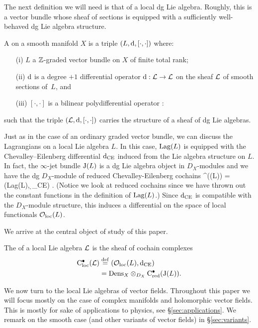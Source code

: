 \documentclass[11pt]{amsart}
\begin{document}
The next definition we will need is that of a local dg Lie algebra. 
Roughly, this is a vector bundle whose sheaf of sections is equipped with a sufficiently well-behaved dg Lie algebra structure.

\begin{dfn} 
A  on a smooth manifold $X$ is a triple $(L, {\rm d}, [\cdot , \cdot])$ where:
\begin{itemize}
\item[(i)] $L$ a $\mathbb Z$-graded vector bundle on $X$ of finite total rank;
\item[(ii)] ${\rm d}$ is a degree $+1$ differential operator ${\rm d} : \mathcal L \to \mathcal L$ on the sheaf $\mathcal L$ of smooth sections of~$L$, and
\item[(iii)] $[\cdot, \cdot]$ is a bilinear polydifferential operator
\beqn
[\cdot , \cdot] : \cL \times \cL \to \cL
\eeqn
\end{itemize}
such that the triple $(\mathcal L, {\rm d}, [\cdot,\cdot])$ carries the structure of a sheaf of dg Lie algebras. 
\end{dfn}

Just as in the case of an ordinary graded vector bundle, we can discuss the Lagrangians on a local Lie algebra $L$. 
In this case, ${\rm Lag}(L)$ is equipped with the Chevalley--Eilenberg differential ${\rm d}_{\rm CE}$ induced from the Lie algebra structure on $L$. 
In fact, the $\infty$-jet bundle ${\rm J}(L)$ is a dg Lie algebra object in $D_X$-modules and we have the dg $D_X$-module of reduced Chevalley-Eilenberg cochains 
\beqn
\cred^\bu (\jet(L)) = ({\rm Lag}(L), \d_{\rm CE}) . 
\eeqn
(Notice we look at reduced cochains since we have thrown out the constant functions in the definition of ${\rm Lag}(L)$.)
Since ${\rm d}_{\rm CE}$ is compatible with the $D_X$-module structure, this induces a differential on the space of local functionals ${\mathcal O}_{\rm loc}(L)$. 

We arrive at the central object of study of this paper.

\begin{dfn}
The  of a local Lie algebra $\mathcal L$ is the sheaf of cochain complexes
\begin{align}
{\rm C}_{\rm loc}^\bullet(\mathcal L) & \overset{\rm def}{=} \left({\mathcal O}_{\rm loc}(L) , {\rm d}_{\rm CE} \right) \\ & = {\rm Dens}_X \otimes_{D_X} {\rm C}_{\rm red}^\bullet({\rm J}(L)).
\end{align}
\end{dfn}

We now turn to the local Lie algebras of vector fields. 
Throughout this paper we will focus mostly on the case of complex manifolds and holomorphic vector fields.
This is mostly for sake of applications to physics, see \S \ref{sec:applications}.
We remark on the smooth case (and other variants of vector fields) in \S \ref{sec:variants}. 
\end{document}
